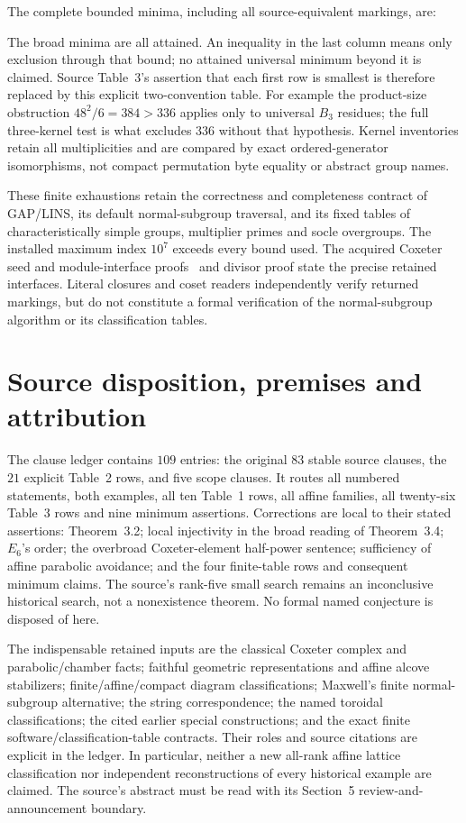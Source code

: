 \documentclass[11pt,a4paper]{article}
\begin{document}
The complete bounded minima, including all source-equivalent markings, are:

The broad minima are all attained. An inequality in the last column means
only exclusion through that bound; no attained universal minimum beyond it
is claimed. Source Table~3's assertion that each first row is smallest is
therefore replaced by this explicit two-convention table. For example the
product-size obstruction $48^2/6=384>336$ applies only to universal
$B_3$ residues; the full three-kernel test is what excludes $336$ without
that hypothesis. Kernel inventories retain all multiplicities and are
compared by exact ordered-generator isomorphisms, not compact permutation
byte equality or abstract group names.

These finite exhaustions retain the correctness and completeness contract
of GAP/LINS, its default normal-subgroup traversal, and its fixed tables of
characteristically simple groups, multiplier primes and socle overgroups.
The installed maximum index $10^7$ exceeds every bound used. The acquired
Coxeter seed and module-interface proofs~\cite{methods} and divisor proof
state the precise retained interfaces. Literal closures and coset readers
independently verify returned markings, but do not constitute a formal
verification of the normal-subgroup algorithm or its classification tables.

\section{Source disposition, premises and attribution}\label{closure}
The clause ledger contains $109$ entries: the original $83$ stable source
clauses, the $21$ explicit Table~2 rows, and five scope clauses. It routes
all numbered statements, both examples, all ten Table~1 rows, all affine
families, all twenty-six Table~3 rows and nine minimum assertions. Corrections
are local to their stated assertions: Theorem~3.2; local injectivity in the
broad reading of Theorem~3.4; $E_6$'s order; the overbroad Coxeter-element
half-power sentence; sufficiency of affine parabolic avoidance; and the
four finite-table rows and consequent minimum claims. The source's
rank-five small search remains an inconclusive historical search, not a
nonexistence theorem. No formal named conjecture is disposed of here.

The indispensable retained inputs are the classical Coxeter complex and
parabolic/chamber facts; faithful geometric representations and affine
alcove stabilizers; finite/affine/compact diagram classifications;
Maxwell's finite normal-subgroup alternative; the string correspondence;
the named toroidal classifications; the cited earlier special constructions;
and the exact finite software/classification-table contracts. Their roles
and source citations are explicit in the ledger. In particular, neither a
new all-rank affine lattice classification nor independent reconstructions
of every historical example are claimed. The source's abstract must be
read with its Section~5 review-and-announcement boundary.
\end{document}
